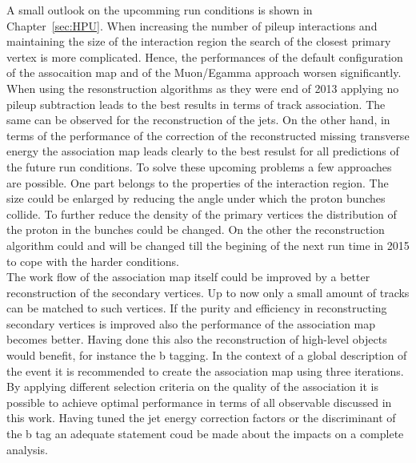 A small outlook on the upcomming run conditions is shown in Chapter~\ref{sec:HPU}. When increasing the number of pileup interactions and maintaining the size of the interaction region the search of the closest primary vertex is more complicated. Hence, the performances of the default configuration of the assocaition map and of the Muon/Egamma approach worsen significantly. When using the resonstruction algorithms as they were end of 2013 applying no pileup subtraction leads to the best results in terms of track association. The same can be observed for the reconstruction of the jets. On the other hand, in terms of the performance of the correction of the reconstructed missing transverse energy the association map leads clearly to the best resulst for all predictions of the future run conditions. To solve these upcoming problems a few approaches are possible. One part belongs to the properties of the interaction region. The size could be enlarged by reducing the angle under which the proton bunches collide. To further reduce the density of the primary vertices the distribution of the proton in the bunches could be changed. On the other the reconstruction algorithm could and will be changed till the begining of the next run time in 2015 to cope with the harder conditions. \\
The work flow of the association map itself could be improved by a better reconstruction of the secondary vertices. Up to now only a small amount of tracks can be matched to such vertices. If the purity and efficiency in reconstructing secondary vertices is improved also the performance of the association map becomes better. Having done this also the reconstruction of high-level objects would benefit, for instance the b tagging. In the context of a global description of the event it is recommended to create the association map using three iterations. By applying different selection criteria on the quality of the association it is possible to achieve optimal performance in terms of all observable discussed in this work. Having tuned the jet energy correction factors or the discriminant of the b tag an adequate statement coud be made about the impacts on a complete analysis.
